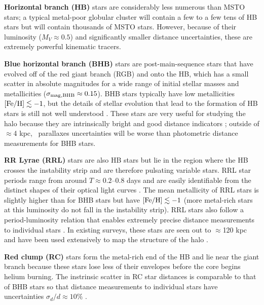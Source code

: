 {\bf Horizontal branch (HB)} stars are considerably less numerous than MSTO
stars; a typical metal-poor globular cluster will contain a few to a few tens of
HB stars but will contain thousands of MSTO stars. However, because of their
luminosity ($M_V \approx 0.5$) and significantly smaller distance uncertainties,
these are extremely powerful kinematic tracers.

{\bf Blue horizontal branch (BHB)} stars are post-main-sequence stars that have
evolved off of the red giant branch (RGB) and onto the HB, which has a small
scatter in absolute magnitudes for a wide range of initial stellar masses and
metallicities ($\sigma_{\rm mag,BHB} \approx 0.15$). BHB stars typically have
low metallicities ${[{\rm Fe}/{\rm H}]} \lesssim -1$, but the details of stellar evolution that
lead to the formation of HB stars is still not well understood
\citep{percival11}. These stars are very useful for studying the halo because
they are intrinsically bright and good distance indicators \cite[$\sigma_{d}/d
\approx 10\%$; see, e.g.,][]{xue08, deason11}; outside of $\approx$4 kpc, \gaia\
parallaxes uncertainties will be worse than photometric distance measurements
for BHB stars.

{\bf RR Lyrae (RRL)} stars are also HB stars but lie in the region where the HB
crosses the instability strip and are therefore pulsating variable stars. RRL
star periods range from around $T \approx 0.2$--$0.8$ days and are easily
identifiable from the distinct shapes of their optical light curves
\citep[e.g.,][]{sesar10}. The mean metallicity of RRL stars is slightly higher
than for BHB stars but have ${[{\rm Fe}/{\rm H}]} \lesssim -1$ (more metal-rich stars at this
luminosity do not fall in the instability strip). RRL stars also follow a
period-luminosity relation \citep[tightest in the mid-infrared;][]{madore12}
that enables extremely precise distance measurements to individual stars
\citep[$\approx$1--2\%;][]{klein14}. In existing surveys, these stars are seen
out to $\approx$120 kpc \citep{sesar10} and have been used extensively to map
the structure of the halo \citep[e.g.,][]{sesar13a}.

{\bf Red clump (RC)} stars form the metal-rich end of the HB and lie near the
giant branch because these stars lose less of their envelopes before the core
begins helium burning. The instrinsic scatter in RC star distances is comparable
to that of BHB stars so that distance measurements to individual stars have
uncertainties $\sigma_{d}/d \approx 10\%$ \citep[e.g.,][]{bovy14-rc}.

